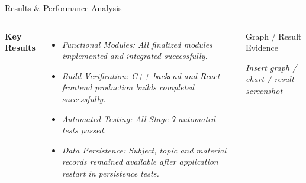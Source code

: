 \documentclass[aspectratio=169,11pt]{beamer}
\newcommand{\placeholder}[1]{%
\textit{\color{GEUGrey}#1}
}
\begin{document}
\begin{frame}{Results \& Performance Analysis}

\begin{columns}[T,totalwidth=\textwidth]

\vspace{-0.8cm}
\textbf{\color{GEUBlue}Key Results}

\begin{itemize}\itemsep3pt
    \item \placeholder{Functional Modules: All finalized modules implemented and integrated successfully.}
    \item \placeholder{Build Verification: C++ backend and React frontend production builds completed successfully.}
    \item \placeholder{Automated Testing: All Stage 7 automated tests passed.
}
    \item \placeholder{Data Persistence: Subject, topic and material records remained available after application restart in persistence tests.}
\end{itemize}


\begin{block}{Graph / Result Evidence}

\centering
\vspace{10mm}

\placeholder{
Insert graph / chart / result screenshot
}

\vspace{10mm}

\end{block}

\end{columns}

\vfill


\end{frame}
\end{document}
